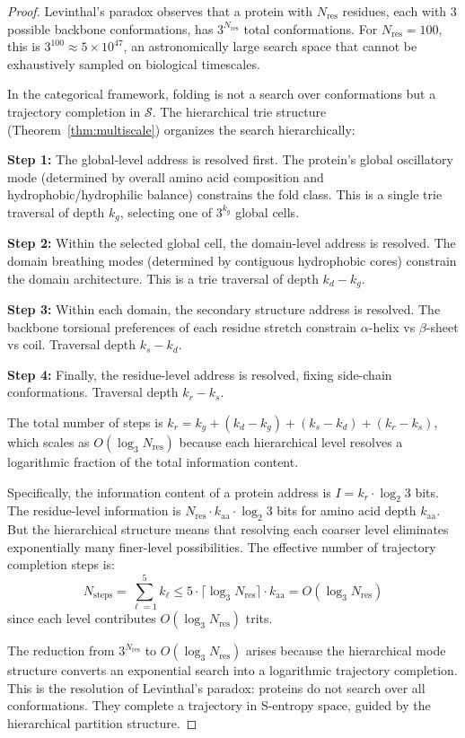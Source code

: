 \documentclass[11pt,twocolumn,a4paper]{article}
\theoremstyle{definition}
\theoremstyle{remark}
\newcommand{\Sspace}{\mathcal{S}}
\newcommand{\Nres}{N_{\mathrm{res}}}
\begin{document}
\begin{proof}
Levinthal's paradox \citep{levinthal1968, levinthal1969} observes that a protein with $\Nres$ residues, each with 3 possible backbone conformations, has $3^{\Nres}$ total conformations. For $\Nres = 100$, this is $3^{100} \approx 5 \times 10^{47}$, an astronomically large search space that cannot be exhaustively sampled on biological timescales.

In the categorical framework, folding is not a search over conformations but a trajectory completion in $\Sspace$. The hierarchical trie structure (Theorem~\ref{thm:multiscale}) organizes the search hierarchically:

\textbf{Step 1:} The global-level address is resolved first. The protein's global oscillatory mode (determined by overall amino acid composition and hydrophobic/hydrophilic balance) constrains the fold class. This is a single trie traversal of depth $k_g$, selecting one of $3^{k_g}$ global cells.

\textbf{Step 2:} Within the selected global cell, the domain-level address is resolved. The domain breathing modes (determined by contiguous hydrophobic cores) constrain the domain architecture. This is a trie traversal of depth $k_d - k_g$.

\textbf{Step 3:} Within each domain, the secondary structure address is resolved. The backbone torsional preferences of each residue stretch constrain $\alpha$-helix vs $\beta$-sheet vs coil. Traversal depth $k_s - k_d$.

\textbf{Step 4:} Finally, the residue-level address is resolved, fixing side-chain conformations. Traversal depth $k_r - k_s$.

The total number of steps is $k_r = k_g + (k_d - k_g) + (k_s - k_d) + (k_r - k_s)$, which scales as $O(\log_3 \Nres)$ because each hierarchical level resolves a logarithmic fraction of the total information content.

Specifically, the information content of a protein address is $I = k_r \cdot \log_2 3$ bits. The residue-level information is $\Nres \cdot k_{\mathrm{aa}} \cdot \log_2 3$ bits for amino acid depth $k_{\mathrm{aa}}$. But the hierarchical structure means that resolving each coarser level eliminates exponentially many finer-level possibilities. The effective number of trajectory completion steps is:
\begin{equation}
N_{\mathrm{steps}} = \sum_{\ell=1}^{5} k_\ell \leq 5 \cdot \lceil \log_3 \Nres \rceil \cdot k_{\mathrm{aa}} = O(\log_3 \Nres)
\end{equation}
since each level contributes $O(\log_3 \Nres)$ trits.

The reduction from $3^{\Nres}$ to $O(\log_3 \Nres)$ arises because the hierarchical mode structure converts an exponential search into a logarithmic trajectory completion. This is the resolution of Levinthal's paradox: proteins do not search over all conformations. They complete a trajectory in S-entropy space, guided by the hierarchical partition structure.
\end{proof}
\end{document}
